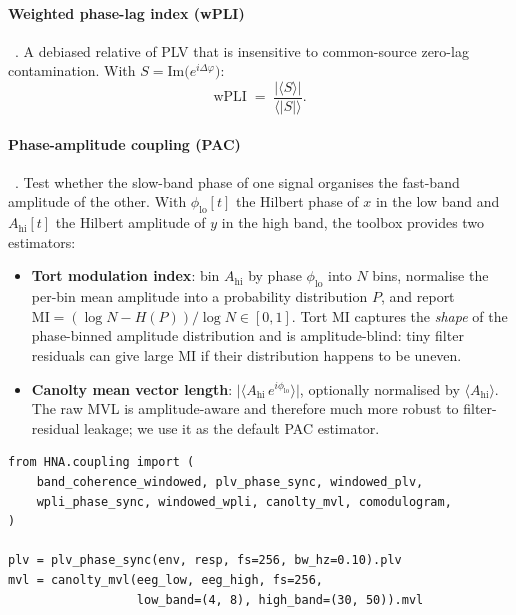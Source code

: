 \documentclass[11pt,a4paper]{article}
\begin{document}
\paragraph{Weighted phase-lag index (wPLI)}~\cite{Vinck2011}.
A debiased relative of PLV that is insensitive to common-source zero-lag
contamination. With $S = \mathrm{Im}\bigl(e^{i\Delta\varphi}\bigr)$:
\begin{equation}
\text{wPLI} \;=\; \frac{|\langle S\rangle|}{\langle |S|\rangle}.
\end{equation}

\paragraph{Phase-amplitude coupling (PAC)}~\cite{Tort2010,Canolty2006}.
Test whether the slow-band phase of one signal organises the fast-band
amplitude of the other. With $\phi_{\text{lo}}[t]$ the Hilbert phase of
$x$ in the low band and $A_{\text{hi}}[t]$ the Hilbert amplitude of $y$
in the high band, the toolbox provides two estimators:
\begin{itemize}
  \item \textbf{Tort modulation index}: bin $A_{\text{hi}}$ by phase
        $\phi_{\text{lo}}$ into $N$ bins, normalise the per-bin mean
        amplitude into a probability distribution $P$, and report
        $\mathrm{MI} = (\log N - H(P))/\log N \in [0,1]$. Tort MI
        captures the \emph{shape} of the phase-binned amplitude
        distribution and is amplitude-blind: tiny filter residuals can
        give large MI if their distribution happens to be uneven.
  \item \textbf{Canolty mean vector length}:
        $\bigl|\langle A_{\text{hi}}\, e^{i\phi_{\text{lo}}}\rangle\bigr|$,
        optionally normalised by $\langle A_{\text{hi}}\rangle$. The raw
        MVL is amplitude-aware and therefore much more robust to
        filter-residual leakage; we use it as the default PAC estimator.
\end{itemize}

\begin{lstlisting}
from HNA.coupling import (
    band_coherence_windowed, plv_phase_sync, windowed_plv,
    wpli_phase_sync, windowed_wpli, canolty_mvl, comodulogram,
)

plv = plv_phase_sync(env, resp, fs=256, bw_hz=0.10).plv
mvl = canolty_mvl(eeg_low, eeg_high, fs=256,
                  low_band=(4, 8), high_band=(30, 50)).mvl
\end{lstlisting}
\end{document}
